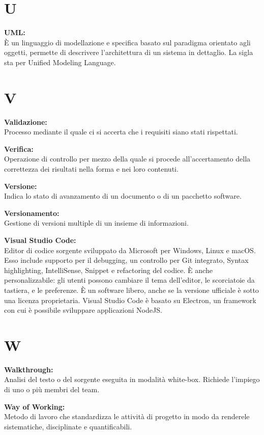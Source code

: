\documentclass[a4paper, oneside, openany, dvipsnames, table]{article}
\begin{document}
\newpage 
\section{U}

\textbf{UML:}\\ \`E un linguaggio di modellazione e specifica basato sul paradigma orientato agli oggetti, permette di descrivere l'architettura di un sistema in dettaglio. La sigla sta per Unified Modeling Language.

\newpage
\section{V}
\textbf{Validazione:}\\	Processo mediante il quale ci si accerta che i requisiti siano stati rispettati.

\textbf{Verifica:}\\	Operazione di controllo per mezzo della quale si procede all'accertamento della correttezza dei risultati nella forma e nei loro contenuti.

\textbf{Versione:}\\ Indica lo stato di avanzamento di un documento o di un pacchetto software.

\textbf{Versionamento:}\\	Gestione di versioni multiple di un insieme di informazioni.

\textbf{Visual Studio Code:}\\	Editor di codice sorgente sviluppato da Microsoft per Windows, Linux e macOS. Esso include supporto per il debugging, un controllo per Git integrato, Syntax highlighting, IntelliSense, Snippet e refactoring del codice. È anche personalizzabile: gli utenti possono cambiare il tema dell'editor,  le scorciatoie da tastiera, e le preferenze. È un software libero, anche se la versione ufficiale è sotto una licenza proprietaria. Visual Studio Code è basato su Electron, un framework con cui è possibile sviluppare applicazioni NodeJS.


\newpage
\section{W}
\textbf{Walkthrough:}\\
Analisi del testo o del sorgente eseguita in modalità white-box. Richiede l'impiego di uno o più membri del team.

\textbf{Way of Working:}\\
Metodo di lavoro che standardizza le attività di progetto in modo da renderele sistematiche, disciplinate
e quantificabili.
\end{document}
